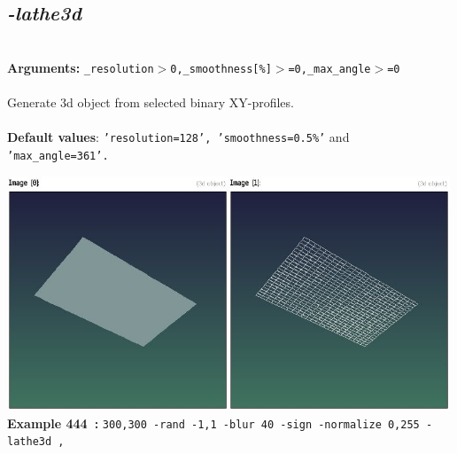 \documentclass[a4paper,11pt,twoside]{book}
\begin{document}
\subsection{\emph{-lathe3d} }\vspace*{-0.5em}
~\\\textbf{Arguments: } 
{\small \texttt{\_resolution$>$0,\_smoothness[\%]$>$=0,\_max\_angle$>$=0}}\\~\\
Generate 3d object from selected binary XY-profiles.
~\\~\\\textbf{Default values}: {\small \texttt{'resolution=128', 'smoothness=0.5\%'} and \texttt{'max\_angle=361'.}}
\begin{center}\includegraphics[keepaspectratio=true,height=7cm,width=\textwidth]{img/gmic_def444.jpg}\\
{\footnotesize \textbf{Example 444~:} \texttt{300,300 -rand -1,1 -blur 40 -sign -normalize 0,255 -lathe3d ,}}
\end{center}
\end{document}

